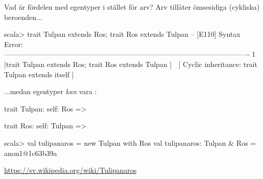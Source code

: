 \begin{Slide}{Vad är fördelen med egentyper i stället för arv?}
\SlideFontSmall
Arv tillåter  ömsesidiga (cykliska) beroenden...

\begin{REPLsmall}
scala> trait Tulpan extends Ros; trait Ros extends Tulpan
-- [E110] Syntax Error: -------------------------------------------------------------------------------------------------------
1 |trait Tulpan extends Ros; trait Ros extends Tulpan
  |                     ^^^
  |                     Cyclic inheritance: trait Tulpan extends itself
  |
\end{REPLsmall}

\vspace{0.5em}
...medan egentyper \emph{kan} vara :
\begin{Code}
trait Tulpan: 
  self: Ros => 

trait Ros:
  self: Tulpan => 
\end{Code}

\begin{REPLnonum}
scala> val tulipanaros = new Tulpan with Ros
val tulipanaros: Tulpan & Ros = anon1@1c63b39a
\end{REPLnonum}
\url{https://sv.wikipedia.org/wiki/Tulipanaros}
\end{Slide}





